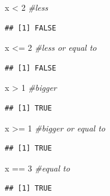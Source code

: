 \documentclass[
]{book}
\newenvironment{Shaded}{\begin{snugshade}}{\end{snugshade}}
\newcommand{\CommentTok}[1]{\textcolor[rgb]{0.56,0.35,0.01}{\textit{#1}}}
\newcommand{\DecValTok}[1]{\textcolor[rgb]{0.00,0.00,0.81}{#1}}
\newcommand{\NormalTok}[1]{#1}
\newcommand{\SpecialCharTok}[1]{\textcolor[rgb]{0.00,0.00,0.00}{#1}}
\theoremstyle{definition}
\theoremstyle{definition}
\theoremstyle{definition}
\theoremstyle{definition}
\theoremstyle{remark}
\begin{document}
\begin{Shaded}
\begin{Highlighting}[]
\NormalTok{x }\SpecialCharTok{\textless{}} \DecValTok{2}      \CommentTok{\#less}
\end{Highlighting}
\end{Shaded}

\begin{verbatim}
## [1] FALSE
\end{verbatim}

\begin{Shaded}
\begin{Highlighting}[]
\NormalTok{x }\SpecialCharTok{\textless{}=} \DecValTok{2}     \CommentTok{\#less or equal to}
\end{Highlighting}
\end{Shaded}

\begin{verbatim}
## [1] FALSE
\end{verbatim}

\begin{Shaded}
\begin{Highlighting}[]
\NormalTok{x }\SpecialCharTok{\textgreater{}} \DecValTok{1}      \CommentTok{\#bigger}
\end{Highlighting}
\end{Shaded}

\begin{verbatim}
## [1] TRUE
\end{verbatim}

\begin{Shaded}
\begin{Highlighting}[]
\NormalTok{x }\SpecialCharTok{\textgreater{}=} \DecValTok{1}     \CommentTok{\#bigger or equal to}
\end{Highlighting}
\end{Shaded}

\begin{verbatim}
## [1] TRUE
\end{verbatim}

\begin{Shaded}
\begin{Highlighting}[]
\NormalTok{x }\SpecialCharTok{==} \DecValTok{3}     \CommentTok{\#equal to}
\end{Highlighting}
\end{Shaded}

\begin{verbatim}
## [1] TRUE
\end{verbatim}
\end{document}
